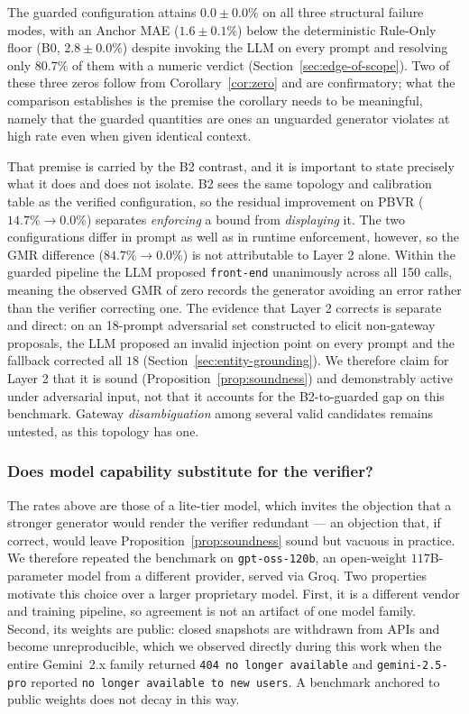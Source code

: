 \documentclass[journal, 10pt]{IEEEtran}
\begin{document}
The guarded configuration attains $0.0\pm0.0\%$ on all three structural failure modes, with an Anchor MAE ($1.6\pm0.1\%$) below the deterministic Rule-Only floor (B0, $2.8\pm0.0\%$) despite invoking the LLM on every prompt and resolving only $80.7\%$ of them with a numeric verdict (Section~\ref{sec:edge-of-scope}). Two of these three zeros follow from Corollary~\ref{cor:zero} and are confirmatory; what the comparison establishes is the premise the corollary needs to be meaningful, namely that the guarded quantities are ones an unguarded generator violates at high rate even when given identical context.

That premise is carried by the B2 contrast, and it is important to state precisely what it does and does not isolate. B2 sees the same topology and calibration table as the verified configuration, so the residual improvement on PBVR ($14.7\%\to0.0\%$) separates \emph{enforcing} a bound from \emph{displaying} it. The two configurations differ in prompt as well as in runtime enforcement, however, so the GMR difference ($84.7\%\to0.0\%$) is not attributable to Layer 2 alone. Within the guarded pipeline the LLM proposed \texttt{front-end} unanimously across all 150 calls, meaning the observed GMR of zero records the generator avoiding an error rather than the verifier correcting one. The evidence that Layer 2 corrects is separate and direct: on an 18-prompt adversarial set constructed to elicit non-gateway proposals, the LLM proposed an invalid injection point on every prompt and the fallback corrected all $18$ (Section~\ref{sec:entity-grounding}). We therefore claim for Layer 2 that it is sound (Proposition~\ref{prop:soundness}) and demonstrably active under adversarial input, not that it accounts for the B2-to-guarded gap on this benchmark. Gateway \emph{disambiguation} among several valid candidates remains untested, as this topology has one.

\subsubsection{Does model capability substitute for the verifier?}
\label{sec:rq1-backend}
The rates above are those of a lite-tier model, which invites the objection that
a stronger generator would render the verifier redundant --- an objection that,
if correct, would leave Proposition~\ref{prop:soundness} sound but vacuous in
practice. We therefore repeated the benchmark on \texttt{gpt-oss-120b}, an
open-weight $117$B-parameter model from a different provider, served via Groq.
Two properties motivate this choice over a larger proprietary model. First, it
is a different vendor and training pipeline, so agreement is not an artifact of
one model family. Second, its weights are public: closed snapshots are withdrawn
from APIs and become unreproducible, which we observed directly during this work
when the entire Gemini~2.x family returned \texttt{404 no longer available} and
\texttt{gemini-2.5-pro} reported \texttt{no longer available to new users}.
A benchmark anchored to public weights does not decay in this way.
\end{document}
